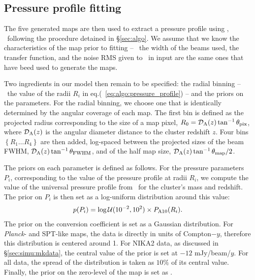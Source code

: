 \subsection{Pressure profile fitting} \label{sec:simu:fit}

The five generated maps are then used to extract a pressure profile using \panco, \ie\ following the procedure detained in \S\ref{sec:algo}.
We assume that we know the characteristics of the map prior to fitting -- \ie\ the width of the beams used, the transfer function, and the noise RMS given to \panco\ in input are the same ones that have beed used to generate the maps.

Two ingredients in our model then remain to be specified: the radial binning -- \ie\ the value of the radii $R_i$ in eq.(~\ref{eq:algo:pressure_profile}) -- and the priors on the parameters.
For the radial binning, we choose one that is identically determined by the angular coverage of each map.
The first bin is defined as the projected radius corresponding to the size of a map pixel, $R_0 = \mathcal{D}_{\rm A}(z) \tan^{-1} \theta_{\rm pix}$, where $\mathcal{D}_{\rm A}(z)$ is the angular diameter distance to the cluster redshift $z$.
Four bins $\left\{R_1 \dots R_4 \right\}$ are then added, log-spaced between the projected sizes of the beam FWHM, $\mathcal{D}_{\rm A}(z) \tan^{-1} \theta_{\rm FWHM}$, and of the half map size, $\mathcal{D}_{\rm A}(z) \tan^{-1} \theta_{\rm map} / 2$.

The priors on each parameter is defined as follows.
For the pressure parameters $P_i$, corresponding to the value of the pressure profile at radii $R_i$, we compute the value of the universal pressure profile from \aten\ for the cluster's mass and redshift.
The prior on $P_i$ is then set as a log-uniform distribution around this value:
\begin{equation}
    \label{eq:simu:prior_Pi}
    p(P_i) = \log\mathcal{U}(10^{-2}, 10^2) \times P_{\rm A10}(R_i).
\end{equation}
The prior on the conversion coefficient is set as a Gaussian distribution.
For \textit{Planck}- and SPT-like maps, the data is directly in units of Compton$-y$, therefore this distribution is centered around 1.
For NIKA2 data, as discussed in \S\ref{sec:simu:mkdata}, the central value of the prior is set at $-12$ mJy/beam/$y$.
For all data, the spread of the distribution is taken as $10\%$ of its central value.
Finally, the prior on the zero-level of the map is set as .

